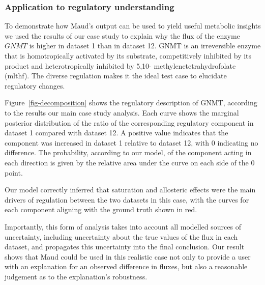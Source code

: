 \documentclass[journal=asbcd6,manuscript=article,layout=traditional]{achemso}
\begin{document}
\hypertarget{application-to-regulatory-understanding}{%
\subsubsection{Application to regulatory
understanding}\label{application-to-regulatory-understanding}}

To demonstrate how Maud's output can be used to yield useful metabolic
insights we used the results of our case study to explain why the flux
of the enzyme \(GNMT\) is higher in dataset 1 than in dataset 12. GNMT
is an irreversible enzyme that is homotropically activated by its
substrate, competitively inhibited by its product and heterotropically
inhibited by 5,10- methylenetetrahydrofolate (mlthf). The diverse
regulation makes it the ideal test case to elucidate regulatory changes.

Figure~\ref{fig-decomposition} shows the regulatory description of GNMT,
according to the results our main case study analysis. Each curve shows
the marginal posterior distribution of the ratio of the corresponding
regulatory component in dataset 1 compared with dataset 12. A positive
value indicates that the component was increased in dataset 1 relative
to dataset 12, with 0 indicating no difference. The probability,
according to our model, of the component acting in each direction is
given by the relative area under the curve on each side of the 0 point.

Our model correctly inferred that saturation and allosteric effects were
the main drivers of regulation between the two datasets in this case,
with the curves for each component aligning with the ground truth shown
in red.

Importantly, this form of analysis takes into account all modelled
sources of uncertainty, including uncertainty about the true values of
the flux in each dataset, and propagates this uncertainty into the final
conclusion. Our result shows that Maud could be used in this realistic
case not only to provide a user with an explanation for an observed
difference in fluxes, but also a reasonable judgement as to the
explanation's robustness.
\end{document}
